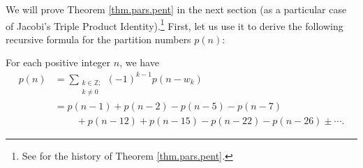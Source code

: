 We will prove Theorem \ref{thm.pars.pent} in the next section (as a particular
case of Jacobi's Triple Product Identity).\footnote{See \cite{Bell06} for the
history of Theorem \ref{thm.pars.pent}.} First, let us use it to derive the
following recursive formula for the partition numbers $p\left(  n\right)  $:

\begin{corollary}
\label{cor.pars.pn-rec}For each positive integer $n$, we have%
\begin{align*}
p\left(  n\right)   &  =\sum_{\substack{k\in\mathbb{Z};\\k\neq0}}\left(
-1\right)  ^{k-1}p\left(  n-w_{k}\right) \\
&  =p\left(  n-1\right)  +p\left(  n-2\right)  -p\left(  n-5\right)  -p\left(
n-7\right) \\
&  \ \ \ \ \ \ \ \ \ \ +p\left(  n-12\right)  +p\left(  n-15\right)  -p\left(
n-22\right)  -p\left(  n-26\right)  \pm\cdots.
\end{align*}

\end{corollary}

